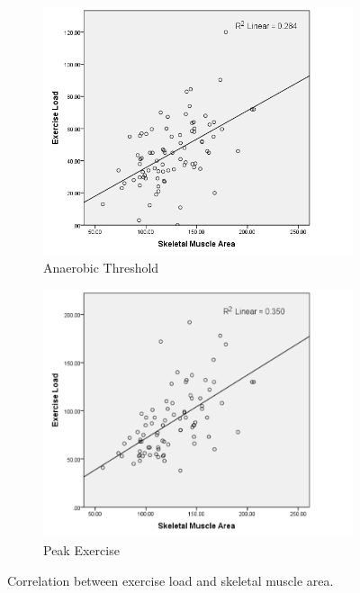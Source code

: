 \begin{figure}[htb]
	\centering
	\begin{subfigure}[b]{0.45\textwidth}
		\centering
		\includegraphics[width=\textwidth]{Figures/bc_scatter_atLoad_skeletal}
		\caption{Anaerobic Threshold}
		\label{fig:bc_at_load_vs_sm}
	\end{subfigure}
	\hfill
	\begin{subfigure}[b]{0.45\textwidth}
		\centering
		\includegraphics[width=\textwidth]{Figures/bc_scatter_pkLoad_skeletal}
		\caption{Peak Exercise}
		\label{fig:bc_pk_load_vs_sm}
	\end{subfigure}
	\caption{Correlation between exercise load and skeletal muscle area.}	
	\label{fig:bc_load_vs_sm}
		
\end{figure}

